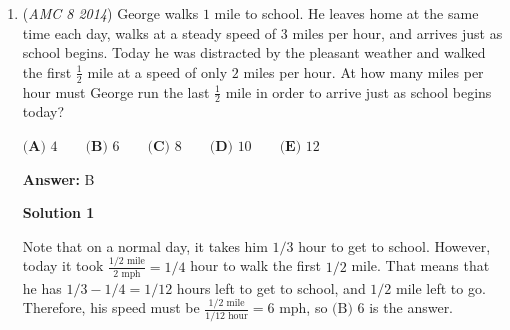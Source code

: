 \begin{enumerate}
 Each team also plays 4 games outside the conference, and there are 8 teams, so there are a total of $4\cdot 8 =32$ games outside the conference.

 Therefore, the total number of games is $56 + 32 = \boxed{\text{(B) }88}$.

 



\textbf{Solution 2}

We can also figure out the number of games the 8 teams play within the conference with the formula n(n - 1)/2, which is used for these kind of match questions, where Team A playing Team B is the same as Team B playing Team A. In this formula, n is the number of teams. So we will do (8 X 7 / 2) X 2, as each team plays the other team twice. The 2s cancel out, to yield 8 X 7, which is 56 games. Then, we can just proceed as above to find the number of games the 8 teams play against 4 teams outside the conference, which is 8 X 4 = 32. Summing these values up yields 88, which is answer choice B.

 


 


	\item (\textit{AMC 8 2014}) George walks $1$ mile to school. He leaves home at the same time each day, walks at a steady speed of $3$ miles per hour, and arrives just as school begins. Today he was distracted by the pleasant weather and walked the first $\frac{1}{2}$ mile at a speed of only $2$ miles per hour. At how many miles per hour must George run the last $\frac{1}{2}$ mile in order to arrive just as school begins today?


 $\textbf{(A) }4\qquad\textbf{(B) }6\qquad\textbf{(C) }8\qquad\textbf{(D) }10\qquad\textbf{(E) }12$

 \textbf{Answer: }B



\textbf{Solution 1}

Note that on a normal day, it takes him $1/3$ hour to get to school. However, today it took $\frac{1/2 \text{ mile}}{2 \text{ mph}}=1/4$ hour to walk the first $1/2$ mile. That means that he has $1/3 -1/4 = 1/12$ hours left to get to school, and $1/2$ mile left to go. Therefore, his speed must be $\frac{1/2 \text{ mile}}{1/12 \text { hour}}=\boxed{6 \text{ mph}}$, so $\boxed{\text{(B) }6}$ is the answer.

 


 



\end{enumerate}
